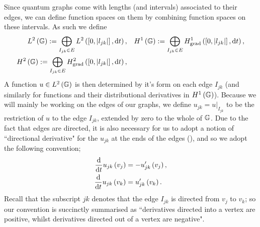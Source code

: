 Since quantum graphs come with lengths (and intervals) associated to their edges, we can define function spaces on them by combining function spaces on these intervals.
As such we define
\begin{subequations} \label{eq:GraphFuncSpaces}
	\begin{align}
		L^2\left( \mathbb{G} \right) := \bigoplus_{I_{jk}\in E} L^{2}\left( \left[ 0,\left\lvert l_{jk} \right\rvert \right],\mathrm{d}t \right),
		&\quad H^1\left( \mathbb{G} \right) := \bigoplus_{I_{jk}\in E} H^1_\mathrm{grad}\left( \left[ 0,\left\lvert l_{jk} \right\rvert \right], \mathrm{d}t \right), \\
		H^2\left( \mathbb{G} \right) := \bigoplus_{I_{jk}\in E} H^2_\mathrm{grad}\left( \left[ 0,\left\lvert l_{jk} \right\rvert \right], \mathrm{d} t \right), &
	\end{align}
\end{subequations}
A function $u\in L^2\left( \mathbb{G} \right)$ is then determined by it's form on each edge $I_{jk}$ (and similarly for functions and their distributional derivatives in $H^1\left( \mathbb{G} \right)$).
Because we will mainly be working on the edges of our graphs, we define $u_{jk} = u\vert_{I_{jk}}$ to be the restriction of $u$ to the edge $I_{jk}$, extended by zero to the whole of $\mathbb{G}$.
Due to the fact that edges are directed, it is also necessary for us to adopt a notion of ``directional derivative" for the $u_{jk}$ at the ends of the edges (), and so we adopt the following convention;
\begin{align*}
	\dfrac{\mathrm{d}}{\mathrm{d}t}u_{jk}\left( v_j \right) &= -u'_{jk}\left( v_j \right), \\
	\dfrac{\mathrm{d}}{\mathrm{d}t}u_{jk}\left( v_k \right) &= u'_{jk}\left( v_k \right).
\end{align*}
Recall that the subscript $jk$ denotes that the edge $I_{jk}$ is directed from $v_j$ to $v_k$; so our convention is succinctly summarised as ``derivatives directed into a vertex are positive, whilst derivatives directed out of a vertex are negative". \newline {}

